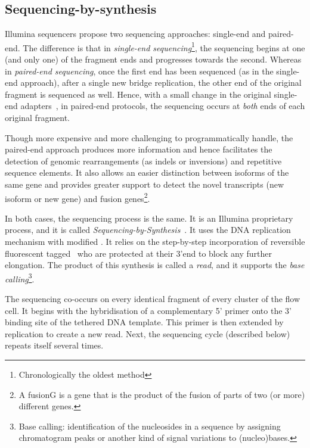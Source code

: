 \subsection{Sequencing-by-synthesis}%
\label{subsub:sequencing}

Illumina sequencers propose two sequencing approaches: single-end and paired-end.
The difference is that in \emph{single-end sequencing}\footnote{Chronologically
the oldest method}, the sequencing begins at one (and only one) of the fragment
ends and progresses towards the second. Whereas in \emph{paired-end sequencing},
once the first end has been sequenced (as in the single-end approach), after a
single new bridge replication, the other end of the original fragment is
sequenced as well.
Hence, with a small change in the original single-end adapters~,
in paired-end protocols, the sequencing occurs at \emph{both}
ends of each original fragment.\mybr\

Though more expensive and more challenging to programmatically handle,
the paired-end approach produces more information and hence facilitates
the detection of genomic rearrangements (as indels or inversions) and
repetitive sequence elements.
It also allows an easier distinction between isoforms of the same gene and provides
greater support to detect the novel transcripts (new isoform or new gene) and fusion
genes\footnote{A \gls{fusionG} is a gene that is the product of the fusion of
parts of two (or more) different genes.}.\mybr\

In both cases, the sequencing process is the same. It is an Illumina proprietary
process, and it is called \emph{Sequencing-by-Synthesis}~.
It uses the \gls{DNA} replication mechanism with modified \dNTPs.
It relies on the step-by-step incorporation of
reversible fluorescent tagged \dNTPs\ who are protected at
their 3'end to block any further elongation.
The product of this synthesis is called a \emph{read}, and
it supports the \emph{base calling}\footnote{Base calling:
identification of the nucleosides in a sequence
by assigning chromatogram peaks
or another kind of signal variations
to (nucleo){}bases.}.\mybr\


The sequencing co-occurs on every identical fragment
of every cluster of the flow cell.
It begins with the hybridisation of a complementary 5' primer onto the 3' binding
site of the tethered \gls{DNA} template. This primer is then extended by
replication to create a new read. Next, the sequencing cycle (described below)
repeats itself several times.\mybr\


